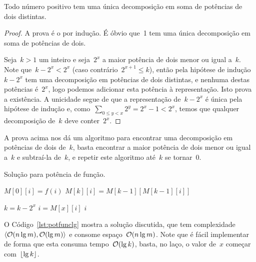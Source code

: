 \documentclass[main.tex]{subfiles}
\begin{document}
\begin{theorem} \label{thm:pot2}
	Todo número positivo tem uma única decomposição em soma de potências de dois distintas.
\end{theorem}
\begin{proof}
	A prova é o por indução. É óbvio que~1 tem uma única decomposição em soma de potências de dois.

	Seja~$k > 1$ um inteiro e seja~$2^x$ a maior potência de dois menor ou igual a~$k$. Note que~$k - 2^x < 2^x$ (caso contrário~$2^{x+1} \leq k$), então pela hipótese de indução~$k - 2^x$ tem uma decomposição em potências de dois distintas, e nenhuma destas potências é~$2^x$, logo podemos adicionar esta potência à representação. Isto prova a existência. A unicidade segue de que a representação de~$k - 2^x$ é única pela hipótese de indução e, como~$\sum\limits_{0 \leq y < x}{2^{y}} = 2^x - 1 < 2^x$, temos que qualquer decomposição de~$k$ deve conter~$2^x$.
\end{proof}

A prova acima nos dá um algoritmo para encontrar uma decomposição em potências de dois de~$k$, basta encontrar a maior potência de dois menor ou igual a~$k$ e subtraí-la de~$k$, e repetir este algoritmo até~$k$ se tornar~0.

\begin{algorithm}
	\caption{Solução para potência de função.} \label{lst:potfunclg}
\begin{algorithmic}[1]
			\State $M[0][i] = f(i)$
		\EndFor
				\State $M[k][i] = M[k - 1][M[k - 1][i]]$
			\EndFor
		\EndFor
	\EndFunction

				\State $k = k - 2^x$
				\State $i = M[x][i]$
			\EndIf
		\EndFor
		\State \Return $i$
	\EndFunction
\end{algorithmic}
\end{algorithm}

O Código~\ref{lst:potfunclg} mostra a solução discutida, que tem complexidade~$\langle\mathcal{O}(n\lg m), \mathcal{O}(\lg m)\rangle$ e consome espaço~$\mathcal{O}(n \lg m)$. Note que é fácil implementar~ de forma que esta consuma tempo~$\mathcal{O}(\lg k)$, basta, no laço, o valor de~$x$ começar com~$\lfloor\lg k\rfloor$.
\end{document}
